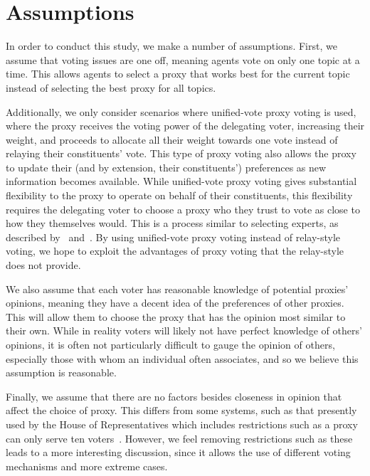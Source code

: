 \section{Assumptions}\label{sec:\chptindicator-assumptions}
In order to conduct this study, we make a number of assumptions.
First, we assume that voting issues are one off, meaning agents vote on only one
topic at a time.
This allows agents to select a proxy that works best for the current topic instead of
selecting the best proxy for all topics.

Additionally, we only consider scenarios where unified-vote proxy voting is used, where
the proxy receives the voting power of the delegating voter, increasing their weight,
and proceeds to allocate all their weight towards one vote   instead of relaying their
constituents' vote.
This type of proxy voting also allows the proxy to update their (and by extension, their
constituents') preferences as new information becomes available.
While unified-vote proxy voting gives substantial flexibility to the proxy to operate
on behalf of their constituents, this flexibility requires the delegating voter to
choose a proxy who they trust to vote as close to how they themselves would.
This is a process similar to selecting experts, as described by~\cite{Miller1969}
and~\cite{Mueller1972}.
By using unified-vote proxy voting instead of relay-style voting, we hope to exploit
the advantages of proxy voting that the relay-style does not provide.  

We also assume that each voter has reasonable knowledge of potential proxies'
opinions, meaning they have a decent idea of the preferences of other proxies.
This will allow them to choose the proxy that has the opinion most similar to their own.
While in reality voters will likely not have perfect knowledge of others' opinions,
it is often not particularly difficult to gauge the opinion of others, especially
those with whom an individual often associates, and so we believe this assumption is
reasonable.

Finally, we assume that there are no factors besides closeness in opinion that affect
the choice of proxy.
This differs from some systems, such as that presently used by the House of
Representatives which includes restrictions such as a proxy can only serve ten
voters~\cite{CERP2020}.
However, we feel removing restrictions such as these leads to a more interesting
discussion, since it allows the use of different voting mechanisms and more extreme
cases.
